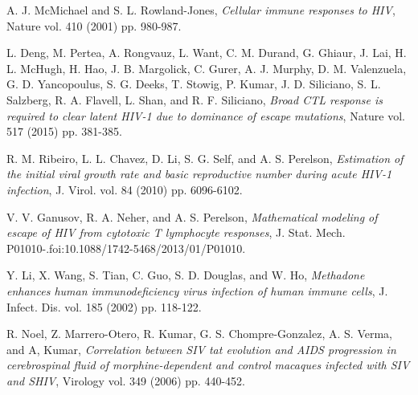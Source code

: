 \documentclass[11pt, oneside]{article}    %
\begin{document}
\begin{thebibliography}{99}
A. J. McMichael and S. L. Rowland-Jones, {\em Cellular immune responses to HIV}, Nature vol. 410 (2001) pp. 980-987.

L. Deng, M. Pertea, A. Rongvauz, L. Want, C. M. Durand, G. Ghiaur, J. Lai, H. L. McHugh, H. Hao, J. B. Margolick, C. Gurer, A. J. Murphy, D. M. Valenzuela, G. D. Yancopoulus, S. G. Deeks, T. Stowig, P. Kumar, J. D. Siliciano, S. L. Salzberg, R. A. Flavell, L. Shan, and R. F. Siliciano, {\em Broad CTL response is required to clear latent HIV-1 due to dominance of escape mutations}, Nature vol. 517 (2015) pp. 381-385.

R. M. Ribeiro, L. L. Chavez, D. Li, S. G. Self, and A. S. Perelson, {\em Estimation of the initial viral growth rate and basic reproductive number during acute HIV-1 infection}, J. Virol. vol. 84 (2010) pp. 6096-6102.


V. V. Ganusov, R. A. Neher, and A. S. Perelson, {\em Mathematical modeling of escape of HIV from cytotoxic T lymphocyte responses}, J. Stat. Mech. P01010-.foi:10.1088/1742-5468/2013/01/P01010.

Y. Li, X. Wang, S. Tian, C. Guo, S. D. Douglas, and W. Ho, {\em Methadone enhances human immunodeficiency virus infection of human immune cells}, J. Infect. Dis. vol. 185 (2002) pp. 118-122.

R. Noel, Z. Marrero-Otero, R. Kumar, G. S. Chompre-Gonzalez, A. S. Verma, and A, Kumar,  {\em Correlation between SIV tat evolution and AIDS progression in cerebrospinal fluid of morphine-dependent and control macaques infected with SIV and SHIV}, Virology vol. 349 (2006) pp. 440-452.


\end{thebibliography}
\end{document}
